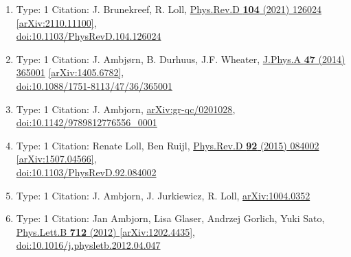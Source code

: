 \documentclass[a4paper,10pt]{article}
\begin{document}
\begin{enumerate}
\begin{enumerate}
  \item Type: 1 Citation: J. Brunekreef, R. Loll, \href{https://www.doi.org/10.1103/PhysRevD.104.126024}{Phys.Rev.D {\bf 104} (2021) 126024}  \href{https://arxiv.org/abs/2110.11100}{[arXiv:2110.11100]},\\\href{https://www.doi.org/10.1103/PhysRevD.104.126024}{doi:10.1103/PhysRevD.104.126024}
  \item Type: 1 Citation: J. Ambjørn, B. Durhuus, J.F. Wheater, \href{https://www.doi.org/10.1088/1751-8113/47/36/365001}{J.Phys.A {\bf 47} (2014) 365001}  \href{https://arxiv.org/abs/1405.6782}{[arXiv:1405.6782]},\\\href{https://www.doi.org/10.1088/1751-8113/47/36/365001}{doi:10.1088/1751-8113/47/36/365001}
  \item Type: 1 Citation: J. Ambjorn, \href{https://arxiv.org/abs/gr-qc/0201028}{arXiv:gr-qc/0201028},\\\href{https://www.doi.org/10.1142/9789812776556_0001}{doi:10.1142/9789812776556\_0001}
  \item Type: 1 Citation: Renate Loll, Ben Ruijl, \href{https://www.doi.org/10.1103/PhysRevD.92.084002}{Phys.Rev.D {\bf 92} (2015) 084002}  \href{https://arxiv.org/abs/1507.04566}{[arXiv:1507.04566]},\\\href{https://www.doi.org/10.1103/PhysRevD.92.084002}{doi:10.1103/PhysRevD.92.084002}
  \item Type: 1 Citation: J. Ambjorn, J. Jurkiewicz, R. Loll, \href{https://arxiv.org/abs/1004.0352}{arXiv:1004.0352}
  \item Type: 1 Citation: Jan Ambjorn, Lisa Glaser, Andrzej Gorlich, Yuki Sato, \href{https://www.doi.org/10.1016/j.physletb.2012.04.047}{Phys.Lett.B {\bf 712} (2012) }  \href{https://arxiv.org/abs/1202.4435}{[arXiv:1202.4435]},\\\href{https://www.doi.org/10.1016/j.physletb.2012.04.047}{doi:10.1016/j.physletb.2012.04.047}

\end{enumerate}
\end{enumerate}
\end{document}
